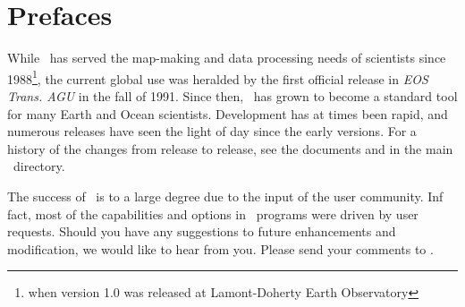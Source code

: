 %
%
\chapter{Prefaces} 
\thispagestyle{headings}

While \GMT\ has served the map-making and data processing needs of scientists since 1988\footnote{when
version 1.0 was released at Lamont-Doherty Earth Observatory}, the current global use was
heralded by the first official release in {\it EOS Trans. AGU} in the fall of 1991.  Since then,
\GMT\ has grown to become a standard tool for many Earth and Ocean scientists.  Development
has at times been rapid, and numerous releases have seen the light of day since the early versions.
For a history of the changes from release to release, see the documents 
and  in the main \GMT\ directory.

The success of \GMT\ is to a large degree due to the input of the user community. Inf fact, most of the
capabilities and options in \GMT\ programs were driven by user requests.
Should you have any suggestions to future enhancements and modification, we would like
to hear from you. Please send your comments to
.
